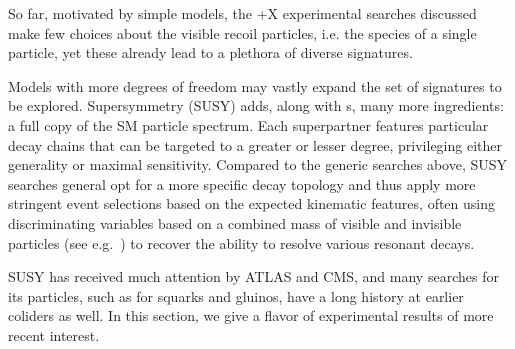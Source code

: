 

So far, motivated by simple models, the \MET+X experimental searches discussed make few choices about the visible recoil particles, i.e. the species of a single particle, yet these already lead to a plethora of diverse signatures.

Models with more degrees of freedom may vastly expand the set of signatures to be explored.
Supersymmetry (SUSY) adds, along with {\IP}s, many more ingredients: a full copy of the SM particle spectrum.
Each superpartner features particular decay chains that can be targeted to a greater or lesser degree, privileging either generality or maximal sensitivity. 
Compared to the generic searches above, SUSY searches general opt for a more specific decay topology and thus apply more stringent event selections based on the expected kinematic features, often using discriminating variables based on a combined mass of visible and invisible particles (see e.g.~\cite{Lester:1999tx}) to recover the ability to resolve various resonant decays.

SUSY has received much attention by ATLAS and CMS, and many searches for its particles, such as for squarks and gluinos, have a long history at earlier coliders as well.
In this section, we give a flavor of experimental results of more recent interest.


